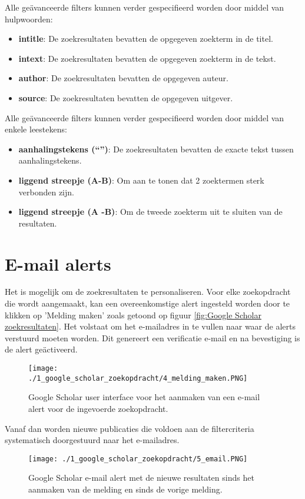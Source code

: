 Alle geävanceerde filters kunnen verder gespecifieerd worden door middel van hulpwoorden:
\begin{itemize}
    \item \textbf{intitle}: De zoekresultaten bevatten de opgegeven zoekterm in de titel.
    \item \textbf{intext}: De zoekresultaten bevatten de opgegeven zoekterm in de tekst.
    \item \textbf{author}: De zoekresultaten bevatten de opgegeven auteur.
    \item \textbf{source}: De zoekresultaten bevatten de opgegeven uitgever.
\end{itemize}

Alle geävanceerde filters kunnen verder gespecifieerd worden door middel van enkele leestekens:
\begin{itemize}
    \item \textbf{aanhalingstekens (``'')}: De zoekresultaten bevatten de exacte tekst tussen aanhalingstekens.
    \item \textbf{liggend streepje (A-B)}: Om aan te tonen dat 2 zoektermen sterk verbonden zijn.
    \item \textbf{liggend streepje (A -B)}: Om de tweede zoekterm uit te sluiten van de resultaten.
\end{itemize}

\section{E-mail alerts}
Het is mogelijk om de zoekresultaten te personaliseren. Voor elke zoekopdracht die wordt aangemaakt, kan een overeenkomstige alert ingesteld worden door te klikken op 'Melding maken' zoals getoond op figuur \ref{fig:Google Scholar zoekresultaten}.
Het volstaat om het e-mailadres in te vullen naar waar de alerts verstuurd moeten worden. Dit genereert een verificatie e-mail en na bevestiging is de alert geäctiveerd.

\begin{figure}
    \centering
    \texttt{[image: ./1\_google\_scholar\_zoekopdracht/4\_melding\_maken.PNG]}
    \caption[Google Scholar melding maken.]{\label{fig:Google Scholar melding maken}Google Scholar user interface voor het aanmaken van een e-mail alert voor de ingevoerde zoekopdracht.}
\end{figure}

Vanaf dan worden nieuwe publicaties die voldoen aan de filtercriteria systematisch doorgestuurd naar het e-mailadres.

\begin{figure}
    \centering
    \texttt{[image: ./1\_google\_scholar\_zoekopdracht/5\_email.PNG]}
    \caption[Google Scholar email alert.]{\label{fig:Google Scholar email alert}Google Scholar e-mail alert met de nieuwe resultaten sinds het aanmaken van de melding en sinds de vorige melding.}
\end{figure}

